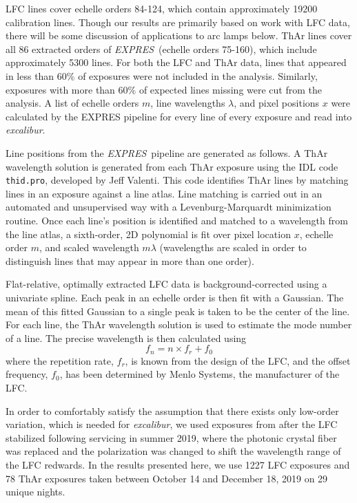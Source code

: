 \documentclass[twocolumn,table,xcolor,trackchanges]{aastex63}
\newcommand{\project}[1]{\textsl{#1}}
\newcommand{\name}{\project{excalibur}}
\newcommand{\acronym}[1]{{\small{#1}}}
\newcommand{\expres}{\project{\acronym{EXPRES}}}
\begin{document}
LFC lines cover echelle orders 84-124, which contain approximately 19200 calibration lines.  Though our results are primarily based on work with LFC data, there will be some discussion of applications to arc lamps below.   ThAr lines cover all 86 extracted orders of \expres\ (echelle orders 75-160), which include approximately 5300 lines.  For both the LFC and ThAr data, lines that appeared in less than 60\% of exposures were not included in the analysis.  Similarly, exposures with more than 60\% of expected lines missing were cut from the analysis.  A list of echelle orders $m$, line wavelengths $\lambda$, and pixel positions $x$ were calculated by the EXPRES pipeline \citep{petersburg2020} for every line of every exposure and read into \name.

Line positions from the \expres\ pipeline are generated as follows.  A ThAr wavelength solution is generated from each ThAr exposure using the IDL code \texttt{thid.pro}, developed by Jeff Valenti.  This code identifies ThAr lines by matching lines in an exposure against a line atlas.  Line matching is carried out in an automated and unsupervised way with a Levenburg-Marquardt minimization routine.  Once each line's position is identified and matched to a wavelength from the line atlas, a sixth-order, 2D polynomial is fit over pixel location $x$, echelle order $m$, and scaled wavelength $m\lambda$ (wavelengths are scaled in order to distinguish lines that may appear in more than one order).
 
 Flat-relative, optimally extracted LFC data is background-corrected using a univariate spline.  Each peak in an echelle order is then fit with a Gaussian.  The mean of this fitted Gaussian to a single peak is taken to be the center of the line.  For each line, the ThAr wavelength solution is used to estimate the mode number of a line.  The precise wavelength is then calculated using
 \begin{equation}
 f_n = n \times  f_r + f_0
 \label{eq:lfc}
 \end{equation}
 where the repetition rate, $f_r$, is known from the design of the LFC, and the offset frequency, $f_0$, has been determined by Menlo Systems, the manufacturer of the LFC.
 
In order to comfortably satisfy the assumption that there exists only low-order variation, which is needed for \name, we used exposures from after the LFC stabilized following servicing in summer 2019, where the photonic crystal fiber was replaced and the polarization was changed to shift the wavelength range of the LFC redwards.  In the results presented here, we use 1227 LFC exposures and 78 ThAr exposures taken between October 14 and December 18, 2019 on 29 unique nights.
\end{document}
